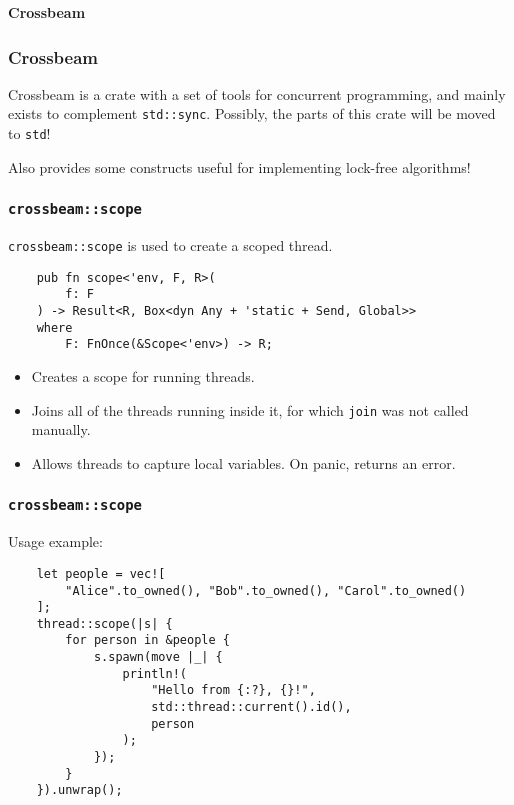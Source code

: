 \documentclass[aspectratio=1610,t]{beamer}
\begin{document}

\begin{frame}[c]
\centering\Huge\textbf{Crossbeam}
\end{frame}


\begin{frame}[fragile]
\frametitle{Crossbeam}
Crossbeam is a crate with a set of tools for concurrent programming, and mainly exists to complement \texttt{std::sync}. Possibly, the parts of this crate will be moved to \texttt{std}!

Also provides some constructs useful for implementing lock-free algorithms!
\end{frame}


\begin{frame}[fragile]
\frametitle{\texttt{crossbeam::scope}}
\texttt{crossbeam::scope} is used to create a scoped thread.

\begin{verbatim}
    pub fn scope<'env, F, R>(
        f: F
    ) -> Result<R, Box<dyn Any + 'static + Send, Global>> 
    where
        F: FnOnce(&Scope<'env>) -> R;
\end{verbatim}

\begin{itemize}
    \item<2-> Creates a scope for running threads.
    \item<3-> Joins all of the threads running inside it, for which \texttt{join} was not called manually.
    \item<4-> Allows threads to capture local variables. On panic, returns an error.
\end{itemize}
\end{frame}


\begin{frame}[fragile]
\frametitle{\texttt{crossbeam::scope}}
Usage example:

\begin{verbatim}
    let people = vec![
        "Alice".to_owned(), "Bob".to_owned(), "Carol".to_owned()
    ];
    thread::scope(|s| {
        for person in &people {
            s.spawn(move |_| {
                println!(
                    "Hello from {:?}, {}!",
                    std::thread::current().id(),
                    person
                );
            });
        }
    }).unwrap();
\end{verbatim}
\end{frame}
\end{document}
